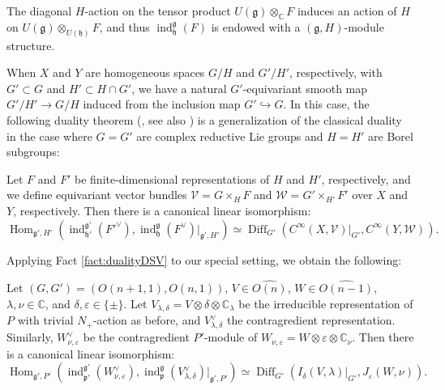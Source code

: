 The diagonal $H$-action 
 on the tensor product $U({\mathfrak{g}}) \otimes_{\mathbb{C}} F$
 induces an action of $H$
 on $U({\mathfrak{g}}) \otimes_{U({\mathfrak{h}})} F$, 
 and thus ${\operatorname{ind}}_{\mathfrak{h}}^{\mathfrak{g}}(F)$
 is endowed with a $({\mathfrak{g}},H)$-module structure.  



When $X$ and $Y$ are homogeneous spaces $G/H$ and $G'/H'$, 
respectively,
 with $G' \subset G$ and $H' \subset H \cap G'$, 
 we have a natural $G'$-equivariant smooth map
 $G'/H' \to G/H$ induced from 
the inclusion map $G' \hookrightarrow G$.  
In this case, 
 the following duality theorem
 (\cite[Thm.~2.9]{KP1}, 
 see also \cite[Thm.~2.4]{KOSS})
 is a generalization
 of the classical duality 
 in the case
 where $G=G'$ are complex reductive Lie groups
 and $H=H'$ are Borel subgroups:

\begin{fact}
\label{fact:dualityDSV}
Let $F$ and $F'$ be finite-dimensional representations
 of $H$ and $H'$, 
respectively,
 and we define equivariant vector bundles ${\mathcal{V}}= G \times_H F$
 and ${\mathcal{W}}= G' \times_{H'} F'$
 over $X$ and $Y$, 
 respectively.  
Then there is a canonical linear isomorphism:
\begin{equation}
\label{eqn:dualDSV}
   {\operatorname{Hom}}_{{\mathfrak{g}}',H'}
   ({\operatorname{ind}}_{\mathfrak{h}'}^{\mathfrak{g}'}
   (F'^{\vee}), 
    {\operatorname{ind}}_{\mathfrak{h}}^{\mathfrak{g}}
    (F^{\vee})|_{{\mathfrak{g}}',H'}
    )
\simeq
   {\operatorname{Diff}}_{G'}
   (C^{\infty}(X,{\mathcal{V}})|_{G'}, C^{\infty}(Y,{\mathcal{W}})).  
\end{equation}
\end{fact}
Applying Fact \ref{fact:dualityDSV}
 to our special setting, 
 we obtain the following:
\begin{proposition}
\label{prop:dualityDSV}
Let $(G, G')=(O(n+1,1), O(n,1))$, 
 $V \in \widehat{O(n)}$, $W \in \widehat{O(n-1)}$,
 $\lambda, \nu\in {\mathbb{C}}$, 
 and $\delta, \varepsilon \in \{\pm\}$.  
Let 
$V_{\lambda,\delta}= V \otimes \delta \otimes {\mathbb{C}}_{\lambda}$
 be the irreducible representation of $P$
 with trivial $N_+$-action as before, 
 and $V_{\lambda,\delta}^{\vee}$ the contragredient representation.  
Similarly,
 $W_{\nu,\varepsilon}^{\vee}$ be the contragredient $P'$-module
 of $W_{\nu,\varepsilon}=W \otimes \varepsilon \otimes {\mathbb{C}}_{\nu}$.  
Then there is a canonical linear isomorphism:
\begin{equation}
\label{eqn:dualVW}
  {\operatorname{Hom}}_{{\mathfrak{g}}',P'}
  ({\operatorname{ind}}_{\mathfrak{p}'}^{\mathfrak{g}'}
   (W_{\nu,\varepsilon}^{\vee}), 
    {\operatorname{ind}}_{\mathfrak{p}}^{\mathfrak{g}}
    (V_{\lambda,\delta}^{\vee})|_{{\mathfrak{g}}',P'}
    )
\simeq
  {\operatorname{Diff}}_{G'}
   (I_{\delta}(V,\lambda)|_{G'},J_{\varepsilon}(W,\nu)).  
\end{equation}
\end{proposition}

